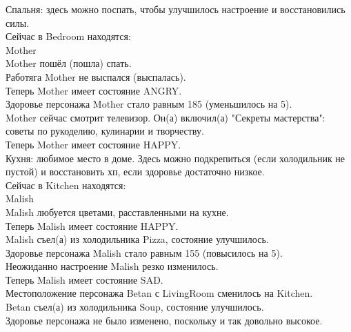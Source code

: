 \noindent Спальня: здесь можно поспать, чтобы улучшилось настроение и восстановились силы. \\
Сейчас в Bedroom находятся: \\
Mother \\
Mother пошёл (пошла) спать. \\
Работяга Mother не выспался (выспалась). \\
Теперь Mother имеет состояние ANGRY. \\
Здоровье персонажа Mother стало равным 185 (уменьшилось на 5). \\
Mother сейчас смотрит телевизор. Он(а) включил(а) "Секреты мастерства": советы по рукоделию, кулинарии и творчеству. \\
Теперь Mother имеет состояние HAPPY. \\

\noindent Кухня: любимое место в доме. Здесь можно подкрепиться (если холодильник не пустой) и восстановить хп, если здоровье достаточно низкое. \\
Сейчас в Kitchen находятся: \\
Malish \\
Malish любуется цветами, расставленными на кухне. \\
Теперь Malish имеет состояние HAPPY. \\
Malish съел(а) из холодильника Pizza, состояние улучшилось. \\
Здоровье персонажа Malish стало равным 155 (повысилось на 5). \\
Неожиданно настроение Malish резко изменилось. \\
Теперь Malish имеет состояние SAD. \\
Местоположение персонажа Betan с LivingRoom сменилось на Kitchen. \\
Betan съел(а) из холодильника Soup, состояние улучшилось. \\
Здоровье персонажа не было изменено, поскольку и так довольно высокое. \\

